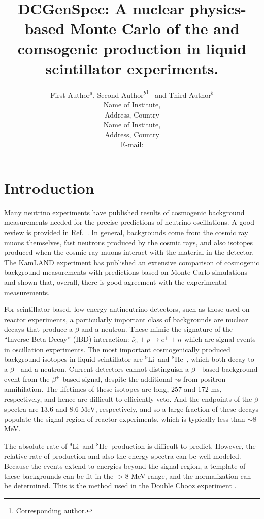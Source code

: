 \documentclass{JINST}
\title{DCGenSpec: A nuclear physics-based Monte Carlo of the \li  and \he 
comsogenic production in liquid scintillator experiments.}
\author{First Author$^a$, Second Author$^b$\thanks{Corresponding
author.}~ and Third Author$^b$\\
\llap{$^a$}Name of Institute,\\
  Address, Country\\
\llap{$^b$}Name of Institute,\\
  Address, Country\\
  E-mail: \email{CorrespondingAuthor@email.com}}
\newcommand{\li}{$^{9}$Li~}
\newcommand{\he}{$^{8}$He~}
\begin{document}
\section{Introduction}


      Many neutrino experiments have published results of cosmogenic background
measurements needed for
      the precise predictions of neutrino oscillations.   A good
      review is provided in Ref.~\cite{doi:10.1146/annurev.nucl.54.070103.181248}.     In
      general, backgrounds come from the cosmic ray muons themselves,
      fast neutrons produced by the cosmic rays, and also isotopes
      produced when the cosmic ray muons interact with the material in
      the detector.   The KamLAND experiment has published an extensive
comparison of
      cosmogenic background measurements with 
      predictions based on Monte Carlo simulations
      ~\cite{PhysRevC.81.025807} and shown that, overall, there is
      good agreement
      with the experimental measurements.
     
      For scintillator-based, low-energy antineutrino detectors, such
     as those used on reactor experiments, a particularly important
     class of backgrounds are nuclear decays that produce a $\beta$
     and a neutron.      These mimic the signature of the 
     ``Inverse Beta Decay'' (IBD) interaction:
      \mbox{$\bar{\nu}_e + p \rightarrow e^+ + n$}
      which are signal events in oscillation experiments.   
      The most 
      important cosmogenically produced background isotopes 
      in liquid scintillator are 
      \li and \he, which both decay to a $\beta^-$ and a neutron.  Current 
     detectors cannot distinguish a $\beta^-$-based background event
     from the $\beta^+$-based signal, despite the additional $\gamma$s
     from positron annihilation.    The lifetimes of these isotopes
     are long,  257 and 172 ms, respectively, and hence are difficult
     to efficiently veto.    And the endpoints of the $\beta$ spectra
     are 13.6 and 8.6 MeV, respectively, and so a large fraction of
     these decays populate the signal region of reactor experiments,
     which is typically less than $\sim$8 MeV.
      
     The absolute rate of \li and \he production is difficult to
     predict.  However,  the relative rate of production and also the
     energy spectra can be well-modeled.  Because the events extend to
     energies beyond the signal region, a template of these
     backgrounds can be fit in the $>$8 MeV range, and the
     normalization can be determined.   This is the method used in the
     Double Chooz experiment \cite{PhysRevLett.108.131801,PhysRevD.86.052008,PhysRevD.87.011102}.
\end{document}
